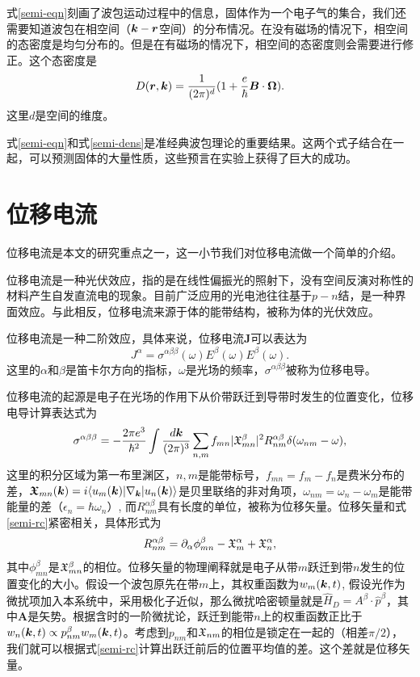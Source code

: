式\ref{semi-eqn}刻画了波包运动过程中的信息，固体作为一个电子气的集合，我们还需要知道波包在相空间（$\boldsymbol{k}-\boldsymbol{r}$空间）的分布情况。在没有磁场的情况下，相空间的态密度是均匀分布的。但是在有磁场的情况下，相空间的态密度则会需要进行修正。这个态密度是
\begin{equation}
D(\boldsymbol{r},\boldsymbol{k})=\frac{1}{(2\pi)^d}(1+\frac{e}{\hbar}\boldsymbol{B}\cdot\boldsymbol{\Omega}).\label{semi-dens}
\end{equation}
这里$d$是空间的维度。

式\ref{semi-eqn}和式\ref{semi-dens}是准经典波包理论的重要结果。这两个式子结合在一起，可以预测固体的大量性质，这些预言在实验上获得了巨大的成功。

\section{位移电流}

位移电流是本文的研究重点之一，这一小节我们对位移电流做一个简单的介绍。

位移电流是一种光伏效应，指的是在线性偏振光的照射下，没有空间反演对称性的材料产生自发直流电的现象。目前广泛应用的光电池往往基于$p-n$结，是一种界面效应。与此相反，位移电流来源于体的能带结构，被称为体的光伏效应。

位移电流是一种二阶效应，具体来说，位移电流$\boldsymbol{J}$可以表达为
\begin{equation}
J^\alpha = \sigma^{\alpha\beta\beta}(\omega) E^\beta(\omega) E^\beta(\omega).
\end{equation}
这里的$\alpha$和$\beta$是笛卡尔方向的指标，$\omega$是光场的频率，$\sigma^{\alpha\beta\beta}$被称为位移电导。

位移电流的起源是电子在光场的作用下从价带跃迁到导带时发生的位置变化，位移电导计算表达式为
\begin{equation}
\sigma^{\alpha\beta\beta}=-\frac{2\pi e^3}{\hbar^2}\int \frac{d\boldsymbol{k}}{(2\pi)^3}\sum_{n,m}f_{mn}|\mathfrak{X}^\beta_{mn}|^2 R_{nm}^{\alpha\beta} \delta(\omega_{nm}-\omega),\label{shift-expr}
\end{equation}
这里的积分区域为第一布里渊区，$n,m$是能带标号，$f_{mn}=f_m-f_n$是费米分布的差，$\boldsymbol{\mathfrak{X}}_{mn}(\boldsymbol{k})=i \langle u_m(\boldsymbol{k})|\nabla_{\boldsymbol{k}}|u_n(\boldsymbol{k}) \rangle$是贝里联络的非对角项，$\omega_{nm}=\omega_n-\omega_m$是能带能量的差（$\epsilon_n=\hbar\omega_n$）, 而$R_{nm}^{\alpha\beta}$具有长度的单位，被称为位移矢量。位移矢量和式\ref{semi-rc}紧密相关，具体形式为
\begin{equation}
R_{nm}^{\alpha\beta}=\partial_\alpha \phi_{mn}^{\beta}-\mathfrak{X}_m^\alpha+\mathfrak{X}_n^\alpha,
\end{equation}
其中$\phi_{mn}^{\beta}$是$\mathfrak{X}_{mn}^{\beta}$的相位。位移矢量的物理阐释就是电子从带$m$跃迁到带$n$发生的位置变化的大小。假设一个波包原先在带$m$上，其权重函数为$w_m(\boldsymbol{k},t)$, 假设光作为微扰项加入本系统中，采用极化子近似，那么微扰哈密顿量就是$\hat{H}_D=A^\beta\cdot\hat{p}^\beta$，其中$\boldsymbol{A}$是矢势。根据含时的一阶微扰论，跃迁到能带$n$上的权重函数正比于$w_n(\boldsymbol{k}, t)\propto p^{\beta}_{nm}w_m(\boldsymbol{k}, t)$。考虑到$p_{nm}$和$\mathfrak{X}_{nm}$的相位是锁定在一起的（相差$\pi/2$），我们就可以根据式\ref{semi-rc}计算出跃迁前后的位置平均值的差。这个差就是位移矢量。

